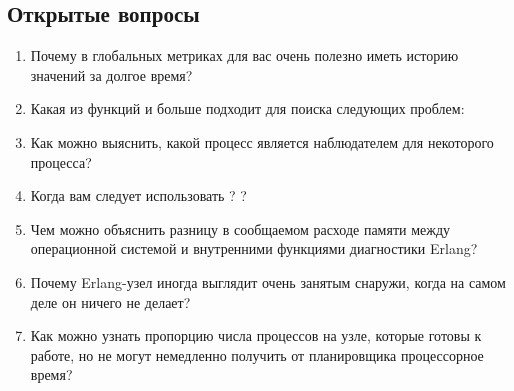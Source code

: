 \documentclass[11pt, oneside]{book}   	%
\newcommand{\OpenEndedTitle}{Открытые вопросы}
\begin{document}
\subsection*{\OpenEndedTitle{}}

\begin{enumerate}
	\item Почему в глобальных метриках для вас очень полезно иметь историю значений за долгое время?
	\item Какая из функций  и  больше подходит для поиска следующих проблем:
	\item Как можно выяснить, какой процесс является наблюдателем для некоторого процесса?
	\item Когда вам следует использовать ? ?
	\item Чем можно объяснить разницу в сообщаемом расходе памяти между операционной системой и внутренними функциями диагностики Erlang?
	\item Почему Erlang-узел иногда выглядит очень занятым снаружи, когда на самом деле он ничего не делает?
	\item Как можно узнать пропорцию числа процессов на узле, которые готовы к работе, но не могут немедленно получить от планировщика процессорное время?
\end{enumerate}
\end{document}
